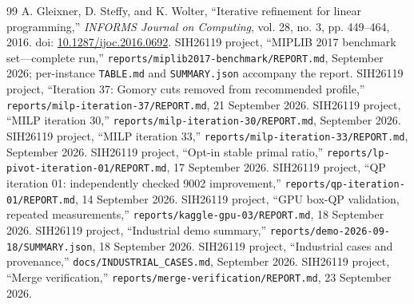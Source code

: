\documentclass[10pt,a4paper,twocolumn]{article}
\newcommand{\smallpath}[1]{\nolinkurl{#1}}
\begin{document}
\begin{thebibliography}{99}
 A. Gleixner, D. Steffy, and K. Wolter, ``Iterative refinement for linear programming,'' \emph{INFORMS Journal on Computing}, vol. 28, no. 3, pp. 449--464, 2016. doi: \href{https://doi.org/10.1287/ijoc.2016.0692}{10.1287/ijoc.2016.0692}.
 SIH26119 project, ``MIPLIB 2017 benchmark set---complete run,'' \smallpath{reports/miplib2017-benchmark/REPORT.md}, September 2026; per-instance \smallpath{TABLE.md} and \smallpath{SUMMARY.json} accompany the report.
 SIH26119 project, ``Iteration 37: Gomory cuts removed from recommended profile,'' \smallpath{reports/milp-iteration-37/REPORT.md}, 21 September 2026.
 SIH26119 project, ``MILP iteration 30,'' \smallpath{reports/milp-iteration-30/REPORT.md}, September 2026.
 SIH26119 project, ``MILP iteration 33,'' \smallpath{reports/milp-iteration-33/REPORT.md}, September 2026.
 SIH26119 project, ``Opt-in stable primal ratio,'' \smallpath{reports/lp-pivot-iteration-01/REPORT.md}, 17 September 2026.
 SIH26119 project, ``QP iteration 01: independently checked 9002 improvement,'' \smallpath{reports/qp-iteration-01/REPORT.md}, 14 September 2026.
 SIH26119 project, ``GPU box-QP validation, repeated measurements,'' \smallpath{reports/kaggle-gpu-03/REPORT.md}, 18 September 2026.
 SIH26119 project, ``Industrial demo summary,'' \smallpath{reports/demo-2026-09-18/SUMMARY.json}, 18 September 2026.
 SIH26119 project, ``Industrial cases and provenance,'' \smallpath{docs/INDUSTRIAL_CASES.md}, September 2026.
 SIH26119 project, ``Merge verification,'' \smallpath{reports/merge-verification/REPORT.md}, 23 September 2026.
\end{thebibliography}
\end{document}
